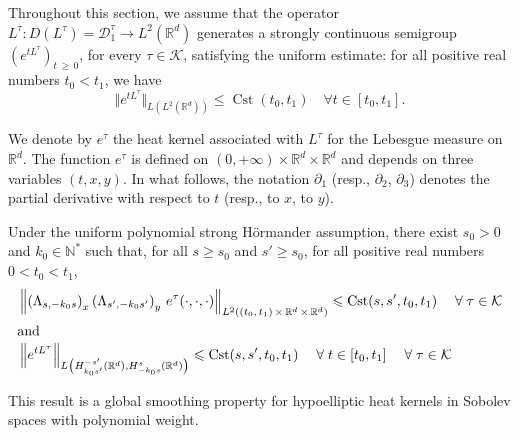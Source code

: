 \documentclass[AHL,Unicode,published]{cedram}
\newcommand*\R{\mathbb{R}}
\newcommand*\N{\mathbb{N}}
\newcommand{\calK}{\mathcal{K}}
\newcommand{\calD}{\mathcal{D}}
\DeclareMathOperator{\Cst}{Cst}
\renewcommand{\geq}{\geqslant}
\renewcommand{\leq}{\leqslant}
\let\oldforall\forall
\renewcommand*{\forall}{\mathrel{\oldforall}}
\begin{document}
Throughout this section, we assume that the operator $L^\tau: D(L^\tau)=\calD^\tau_1\rightarrow L^2(\R^d)$ generates a strongly continuous semigroup $(e^{tL^\tau})_{t\,\geq\,0}$, for every $\tau\in\calK$, satisfying the uniform estimate: for all positive real numbers $t_0<t_1$, we have
\begin{equation}\label{13:05}
\Vert e^{tL^\tau}\Vert_{L\left(L^2\left(\R^d\right)\right)}\leq \Cst(t_0,t_1) \quad\forall t\in[t_0,t_1].
\end{equation}


We denote by $e^\tau$ the heat kernel associated with $L^\tau$ for the Lebesgue measure on $\R^d$. The function $e^\tau$ is defined on $(0,+\infty)\times\R^d\times\R^d$ and depends on three variables $(t,x,y)$. In what follows, the notation $\partial_1$ (resp., $\partial_2$, $\partial_3$) denotes the partial derivative with respect to $t$ (resp., to $x$, to $y$).


\begin{coro}\label{cor_heat_uniform_global}
Under the uniform polynomial strong H\"ormander assumption, there exist $s_0>0$ and $k_0\in\N^*$ such that, for all $s\geq s_0$ and $s'\geq s_0$, for all positive real numbers $0<t_0<t_1$,
\begin{align*}
&\left\Vert \left(\Lambda_{s,-k_0s}\right)_x \left(\Lambda_{s',-k_0s'}\right)_{y}\, e^\tau(\cdot,\cdot,\cdot) \right\Vert_{L^2\left((t_0,\,t_1)\,\times\,\R^d\,\times\,\R^d\right)}\leq \Cst(s,s',t_0,t_1) \quad \forall \tau\in\calK
\\
\intertext{and}
& \left\Vert e^{t L^\tau} \right\Vert_{L\left(H^{-s'}_{k_0s'}\left(\R^d\right), H^{s}_{-k_0s}\left(\R^d\right)\right)}
\leq \Cst(s,s',t_0,t_1)
\quad \forall t\in[t_0,t_1]\quad \forall \tau\in\calK
\end{align*}
\end{coro}

This result is a global smoothing property for hypoelliptic heat kernels in Sobolev spaces with polynomial weight.
\end{document}
